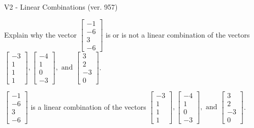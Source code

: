 \begin{exercise}
  \begin{exerciseTitle}V2 - Linear Combinations (ver. 957)\end{exerciseTitle}
  \begin{exerciseStatement}
    Explain why the vector \(\left[\begin{array}{c}
-1 \\
-6 \\
3 \\
-6
\end{array}\right]\)  is or is not a linear 
	combination of the vectors \(\left[\begin{array}{c}
-3 \\
1 \\
1 \\
1
\end{array}\right] , \left[\begin{array}{c}
-4 \\
1 \\
0 \\
-3
\end{array}\right] , \text{ and } \left[\begin{array}{c}
3 \\
2 \\
-3 \\
0
\end{array}\right]\).
	


  \end{exerciseStatement}
  \begin{exerciseAnswer}
   \(\left[\begin{array}{c}
-1 \\
-6 \\
3 \\
-6
\end{array}\right]\) 
  	 is  
	a linear combination of the vectors \(\left[\begin{array}{c}
-3 \\
1 \\
1 \\
1
\end{array}\right] , \left[\begin{array}{c}
-4 \\
1 \\
0 \\
-3
\end{array}\right] , \text{ and } \left[\begin{array}{c}
3 \\
2 \\
-3 \\
0
\end{array}\right]\).

	
  


  \end{exerciseAnswer}
\end{exercise}